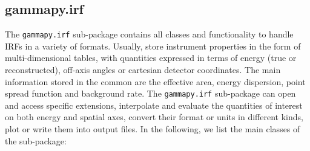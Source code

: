 \documentclass[traditabstract, longauth]{aa}
\newcommand{\code}[1]{\texttt{#1}}
\begin{document}
\subsection{gammapy.irf}
\label{ssec:gammapy-irf}
%
%
%
The \code{gammapy.irf} sub-package contains all classes and functionality
to handle IRFs in a variety of formats.
Usually, \irfs store instrument properties in the form of multi-dimensional
tables, with quantities expressed in terms of energy (true or reconstructed),
off-axis angles or cartesian detector coordinates. The main information stored in
the common \gammaray \irfs are the effective area, energy dispersion,
point spread function and background rate. The \code{gammapy.irf}
sub-package can open and access specific \irf extensions,
interpolate and evaluate the quantities of interest on both energy and spatial
axes, convert their format or units in different kinds, plot or write them into
output files. In the following, we list the main classes of the
sub-package:
\end{document}
